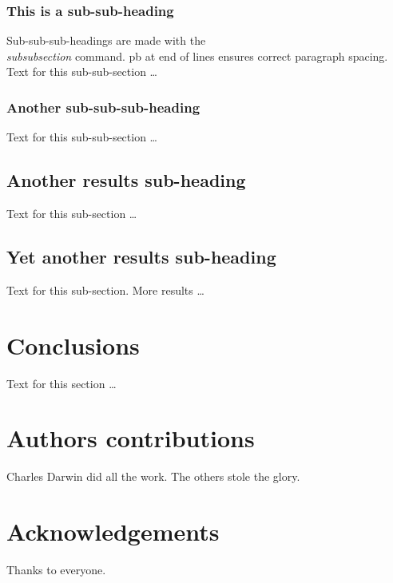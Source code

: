 \documentclass[10pt]{bmc_article}
\newenvironment{bmcformat}{\begin{raggedright}\baselineskip20pt\sloppy\setboolean{publ}{false}}{\end{raggedright}\baselineskip20pt\sloppy}
\begin{document}
\begin{bmcformat}
    \subsubsection*{This is a sub-sub-heading}
      Sub-sub-sub-headings are made with the \textsl{\\subsubsection} command. \pb
      pb at end of lines ensures correct paragraph spacing.\pb
	  Text for this sub-sub-section \ldots
    \subsubsection*{Another sub-sub-sub-heading}
      Text for this sub-sub-section \ldots

  \subsection*{Another results sub-heading}
    Text for this sub-section \ldots

  \subsection*{Yet another results sub-heading}
    Text for this sub-section.  More results \ldots


    

\section*{Conclusions}
  Text for this section \ldots


\section*{Authors contributions}
   Charles Darwin did all the work. The others stole the glory. 

    

\section*{Acknowledgements}
  Thanks to everyone.


 



\end{bmcformat}
\end{document}
